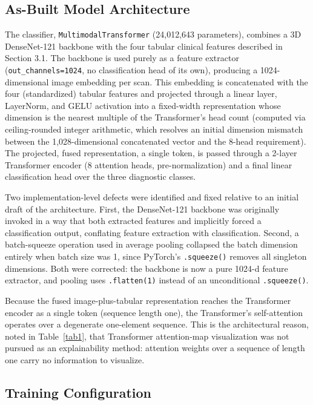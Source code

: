 \documentclass[pdflatex,sn-mathphys-num]{sn-jnl}%
\theoremstyle{thmstyleone}%
\theoremstyle{thmstyletwo}%
\theoremstyle{thmstylethree}%
\begin{document}
\subsection{As-Built Model Architecture}\label{sec3_4}

The classifier, \texttt{MultimodalTransformer} (24,012,643 parameters), combines a 3D DenseNet-121 backbone with the four tabular clinical features described in Section 3.1. The backbone is used purely as a feature extractor (\texttt{out\_channels=1024}, no classification head of its own), producing a 1024-dimensional image embedding per scan. This embedding is concatenated with the four (standardized) tabular features and projected through a linear layer, LayerNorm, and GELU activation into a fixed-width representation whose dimension is the nearest multiple of the Transformer's head count (computed via ceiling-rounded integer arithmetic, which resolves an initial dimension mismatch between the 1,028-dimensional concatenated vector and the 8-head requirement). The projected, fused representation, a single token, is passed through a 2-layer Transformer encoder (8 attention heads, pre-normalization) and a final linear classification head over the three diagnostic classes.

Two implementation-level defects were identified and fixed relative to an initial draft of the architecture. First, the DenseNet-121 backbone was originally invoked in a way that both extracted features and implicitly forced a classification output, conflating feature extraction with classification. Second, a batch-squeeze operation used in average pooling collapsed the batch dimension entirely when batch size was 1, since PyTorch's \texttt{.squeeze()} removes all singleton dimensions. Both were corrected: the backbone is now a pure 1024-d feature extractor, and pooling uses \texttt{.flatten(1)} instead of an unconditional \texttt{.squeeze()}.

Because the fused image-plus-tabular representation reaches the Transformer encoder as a single token (sequence length one), the Transformer's self-attention operates over a degenerate one-element sequence. This is the architectural reason, noted in Table~\ref{tab1}, that Transformer attention-map visualization was not pursued as an explainability method: attention weights over a sequence of length one carry no information to visualize.

\subsection{Training Configuration}\label{sec3_5}
\end{document}
